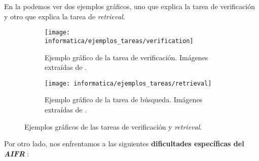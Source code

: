 
En la  podemos ver dos ejemplos gráficos, uno que explica la tarea de verificación y otro que explica la tarea de \textit{retrieval}.

\begin{figure}
	\centering
	\begin{subfigure}{1.0\textwidth}
		\centering
		\texttt{[image: informatica/ejemplos\_tareas/verification]}
		\caption{Ejemplo gráfico de la tarea de verificación. Imágenes extraídas de \cite{informatica:cacd_dataset}.}
	\end{subfigure}%

	\begin{subfigure}{1.0\textwidth}
		\centering
		\texttt{[image: informatica/ejemplos\_tareas/retrieval]}
		\caption{Ejemplo gráfico de la tarea de búsqueda. Imágenes extraídas de \cite{informatica:cacd_dataset}.}
	\end{subfigure}
	\caption{Ejemplos gráficos de las tareas de verificación y \textit{retrieval}.}
	\label{img:ejemplo_verificacion_retrieval}
\end{figure}

Por otro lado, nos enfrentamos a las siguientes \textbf{dificultades específicas del \textit{AIFR}} \cite{informatica:challenges_retrieval}:

